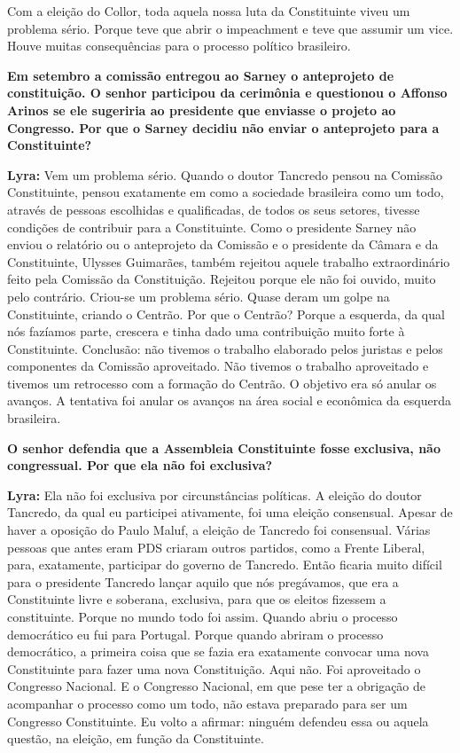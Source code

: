 Com a eleição do Collor, toda aquela nossa luta da Constituinte viveu um
problema sério. Porque teve que abrir o impeachment e teve que assumir
um vice. Houve muitas consequências para o processo político brasileiro.

\textbf{Em setembro a comissão entregou ao Sarney o anteprojeto de
constituição. O senhor participou da cerimônia e questionou o Affonso
Arinos se ele sugeriria ao presidente que enviasse o projeto ao
Congresso. Por que o Sarney decidiu não enviar o anteprojeto para a
Constituinte?}

\textbf{Lyra:} Vem um problema sério. Quando o doutor Tancredo pensou na
Comissão Constituinte, pensou exatamente em como a sociedade brasileira
como um todo, através de pessoas escolhidas e qualificadas, de todos os
seus setores, tivesse condições de contribuir para a Constituinte. Como
o presidente Sarney não enviou o relatório ou o anteprojeto da Comissão
e o presidente da Câmara e da Constituinte, Ulysses Guimarães, também
rejeitou aquele trabalho extraordinário feito pela Comissão da
Constituição. Rejeitou porque ele não foi ouvido, muito pelo contrário.
Criou-se um problema sério. Quase deram um golpe na Constituinte,
criando o Centrão. Por que o Centrão? Porque a esquerda, da qual nós
fazíamos parte, crescera e tinha dado uma contribuição muito forte à
Constituinte. Conclusão: não tivemos o trabalho elaborado pelos juristas
e pelos componentes da Comissão aproveitado. Não tivemos o trabalho
aproveitado e tivemos um retrocesso com a formação do Centrão. O
objetivo era só anular os avanços. A tentativa foi anular os avanços na
área social e econômica da esquerda brasileira.

\textbf{O senhor defendia que a Assembleia Constituinte fosse exclusiva,
não congressual. Por que ela não foi exclusiva?}

\textbf{Lyra:} Ela não foi exclusiva por circunstâncias políticas. A
eleição do doutor Tancredo, da qual eu participei ativamente, foi uma
eleição consensual. Apesar de haver a oposição do Paulo Maluf, a eleição
de Tancredo foi consensual. Várias pessoas que antes eram PDS criaram
outros partidos, como a Frente Liberal, para, exatamente, participar do
governo de Tancredo. Então ficaria muito difícil para o presidente
Tancredo lançar aquilo que nós pregávamos, que era a Constituinte livre
e soberana, exclusiva, para que os eleitos fizessem a constituinte.
Porque no mundo todo foi assim. Quando abriu o processo democrático eu
fui para Portugal. Porque quando abriram o processo democrático, a
primeira coisa que se fazia era exatamente convocar uma nova
Constituinte para fazer uma nova Constituição. Aqui não. Foi aproveitado
o Congresso Nacional. E o Congresso Nacional, em que pese ter a
obrigação de acompanhar o processo como um todo, não estava preparado
para ser um Congresso Constituinte. Eu volto a afirmar: ninguém defendeu
essa ou aquela questão, na eleição, em função da Constituinte.

